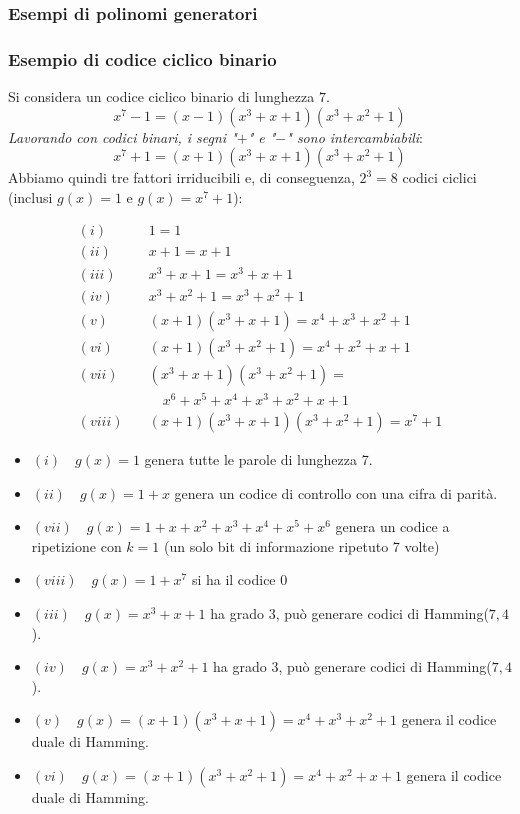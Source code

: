 \subsubsection{Esempi di polinomi generatori}


\subsubsection{Esempio di codice ciclico binario}
Si considera un codice ciclico binario di lunghezza $7$.
$$x^7 -1 =(x-1)(x^3 + x +1)(x^3 + x^2 + 1)$$
\textit{Lavorando con codici binari, i segni "$+$" e "$-$" sono intercambiabili}:
$$x^7 +1 =(x+1)(x^3 + x +1)(x^3 + x^2 + 1)$$
Abbiamo quindi tre fattori irriducibili e, di conseguenza, $2^3=8$ codici ciclici (inclusi $g(x)=1$ e $g(x)= x^7+1$):
\begin{center}
\renewcommand{\arraystretch}{1.2}
\[
\begin{aligned}
    (i)   \quad & 1 = 1 \\
    (ii)  \quad & x + 1 = x + 1 \\
    (iii) \quad & x^3 + x + 1 = x^3 + x + 1 \\
    (iv)  \quad & x^3 + x^2 + 1 = x^3 + x^2 + 1 \\
    (v)   \quad & (x + 1)(x^3 + x + 1) = x^4 + x^3 + x^2 + 1 \\
    (vi)  \quad & (x + 1)(x^3 + x^2 + 1) = x^4 + x^2 + x + 1 \\
    (vii) \quad & (x^3 + x + 1)(x^3 + x^2 + 1) = \\
                & \quad x^6 + x^5 + x^4 + x^3 + x^2 + x + 1 \\
    (viii)\quad & (x + 1)(x^3 + x + 1)(x^3 + x^2 + 1) = x^7 + 1
\end{aligned}
\]
\end{center}
\begin{itemize}
    \item $(i) \quad g(x) =1$ genera tutte le parole di lunghezza 7.
    \item $(ii) \quad g(x) =1+x$ genera un codice di controllo con una cifra di parità.
    \item $(vii) \quad g(x) = 1+x + x^2+x^3+x^4+x^5+x^6$ genera un codice a ripetizione con $k=1$ (un solo bit di informazione ripetuto 7 volte)
    \item $(viii) \quad g(x) =1+x^7$ si ha il codice $0$
    \item $(iii) \quad g(x) = x^3+x+1$ ha grado $3$, può generare codici di Hamming($7,4$).
    \item $(iv) \quad g(x) = x^3+x^2+1$ ha grado $3$, può generare codici di Hamming($7,4$).
    \item $(v) \quad g(x) = (x+1)(x^3+x+1)=x^4+x^3+x^2+1$ genera il codice duale di Hamming.
    \item $(vi) \quad g(x) = (x+1)(x^3+x^2+1)=x^4+x^2+x+1$ genera il codice duale di Hamming.
\end{itemize}

